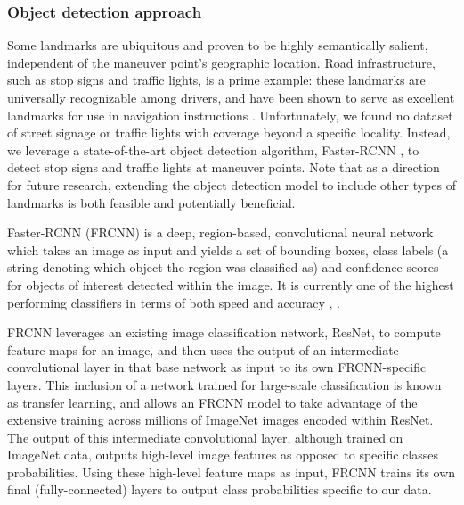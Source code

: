 \subsubsection{Object detection approach}
Some landmarks are ubiquitous and proven to be highly semantically salient, independent of the maneuver point's geographic location. Road infrastructure, such as stop signs and traffic lights, is a prime example: these landmarks are universally recognizable among drivers, and have been shown to serve as excellent landmarks for use in navigation instructions \cite{may_ross_bayer_2005}. Unfortunately, we found no dataset of street signage or traffic lights with coverage beyond a specific locality. Instead, we leverage a state-of-the-art object detection algorithm, Faster-RCNN \cite{ren2015faster}, to detect stop signs and traffic lights at maneuver points. Note that as a direction for future research, extending the object detection model to include other types of landmarks is both feasible and potentially beneficial.

Faster-RCNN (FRCNN) is a deep, region-based, convolutional neural network which takes an image as input and yields a set of bounding boxes, class labels (a string denoting which object the region was classified as) and confidence scores for objects of interest detected within the image\cite{ren2015faster}. It is currently one of the highest performing classifiers in terms of both speed and accuracy \cite{russakovsky2015imagenet}, \cite{ren2015faster}. 

FRCNN leverages an existing image classification network, ResNet, to compute feature maps for an image, and then uses the output of an intermediate convolutional layer in that base network as input to its own FRCNN-specific layers. This inclusion of a network trained for large-scale classification is known as transfer learning, and allows an FRCNN model to take advantage of the extensive training across millions of ImageNet images encoded within ResNet. The output of this intermediate convolutional layer, although trained on ImageNet data, outputs high-level image features as opposed to specific classes probabilities. Using these high-level feature maps as input, FRCNN trains its own final (fully-connected) layers to output class probabilities specific to our data.

